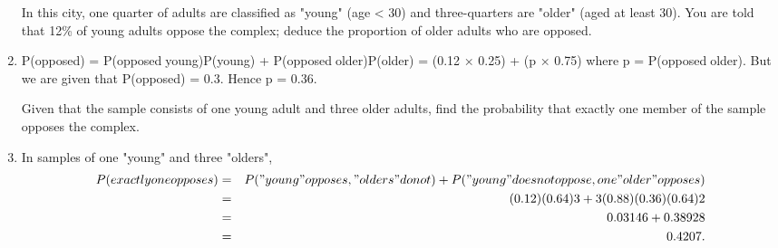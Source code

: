 \documentclass[a4paper,12pt]{article}
\begin{document}
\begin{enumerate}
\begin{framed} In this city, one quarter of adults are classified as "young" (age < 30) and three-quarters are "older" (aged at least 30).  You are told that 12\% of young adults oppose the complex;  deduce the proportion of older adults who are opposed.  
\end{framed}

\item P(opposed) = P(opposedyoung)P(young) + P(opposedolder)P(older)
= (0.12 × 0.25) + (p × 0.75)
where p = P(opposedolder). But we are given that P(opposed) = 0.3. Hence
p = 0.36.


 
 
\begin{framed} Given that the sample consists of one young adult and three older adults, find the probability that exactly one member of the sample opposes the complex. 
\end{framed}
\item In samples of one "young" and three "olders",
\begin{eqnarray*}
P(exactly one opposes) &=& P("young" opposes, "olders" do not)
 + P("young" does not oppose, one "older" opposes)\\
&=& {(0.12)(0.64)3} + {3(0.88)(0.36)(0.64)2}\\ &=& 0.03146 + 0.38928\\
&=& 0.4207.
\end{eqnarray*}
\end{enumerate}
\end{document}
